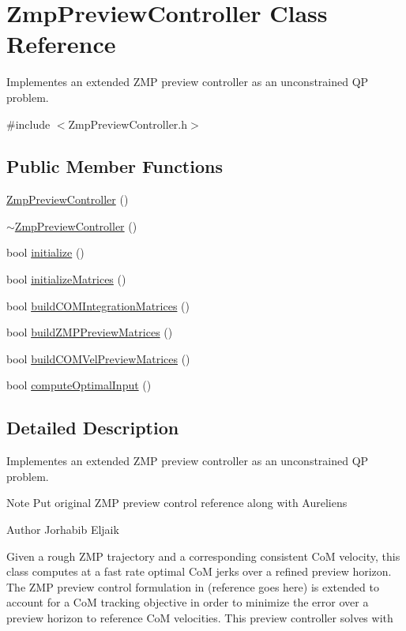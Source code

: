 \hypertarget{classZmpPreviewController}{}\section{Zmp\+Preview\+Controller Class Reference}
\label{classZmpPreviewController}


Implementes an extended Z\+MP preview controller as an unconstrained QP problem.  




{\ttfamily \#include $<$Zmp\+Preview\+Controller.\+h$>$}

\subsection*{Public Member Functions}
\begin{DoxyCompactItemize}
\item 
\hyperlink{classZmpPreviewController_ac8837fd39b0b942afd3dd5759c456b42}{Zmp\+Preview\+Controller} ()
\item 
\hyperlink{classZmpPreviewController_af702c45f318c7a78310d19cc061886dd}{$\sim$\+Zmp\+Preview\+Controller} ()
\item 
bool \hyperlink{classZmpPreviewController_ac28287e01187bff2cea5a68292d936bd}{initialize} ()
\item 
bool \hyperlink{classZmpPreviewController_a65905572c73752a3ff46c0435c9794a0}{initialize\+Matrices} ()
\item 
bool \hyperlink{classZmpPreviewController_a378a6408072c1d7b962e8e52af30b634}{build\+C\+O\+M\+Integration\+Matrices} ()
\item 
bool \hyperlink{classZmpPreviewController_aadf1b7cba1ac0a1e6ec3bc8e0b761d02}{build\+Z\+M\+P\+Preview\+Matrices} ()
\item 
bool \hyperlink{classZmpPreviewController_aa763d1c7a769f21eeaaaeb3f09a32aef}{build\+C\+O\+M\+Vel\+Preview\+Matrices} ()
\item 
bool \hyperlink{classZmpPreviewController_a321140d8b3d99cf82687c444344c161d}{compute\+Optimal\+Input} ()
\end{DoxyCompactItemize}


\subsection{Detailed Description}
Implementes an extended Z\+MP preview controller as an unconstrained QP problem. 

\begin{DoxyNote}{Note}
Put original Z\+MP preview control reference along with Aurelien\textquotesingle{}s
\end{DoxyNote}
\begin{DoxyAuthor}{Author}
Jorhabib Eljaik
\end{DoxyAuthor}
Given a rough Z\+MP trajectory and a corresponding consistent CoM velocity, this class computes at a fast rate optimal CoM jerks over a refined preview horizon. The Z\+MP preview control formulation in (reference goes here) is extended to account for a CoM tracking objective in order to minimize the error over a preview horizon to reference CoM velocities. This preview controller solves with

